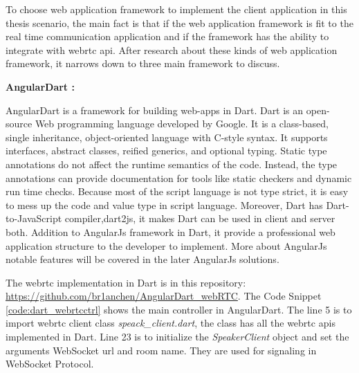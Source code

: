 \noindent To choose web application framework to implement the client application in this thesis scenario, the main fact is that if the web  application framework is fit to the real time communication application and if the framework has the ability to integrate with \gls{webrtc} \gls{api}. After research about these kinds of web application framework, it narrows down to three main framework to discuss.

\textbf{AngularDart :}

\par AngularDart is a framework for building web-apps in Dart. Dart is an open-source Web programming language developed by Google. It is a class-based, single inheritance, object-oriented language with C-style syntax. It supports interfaces, abstract classes, reified generics, and optional typing. Static type annotations do not affect the runtime semantics of the code. Instead, the type annotations can provide documentation for tools like static checkers and dynamic run time checks.\cite{wiki:dart} Because most of the script language is not type strict, it is easy to mess up the code and value type in script language. Moreover, Dart has Dart-to-JavaScript compiler,dart2js, it makes Dart can be used in client and server both. Addition to AngularJs framework in Dart, it provide a professional web application structure to the developer to implement. More about AngularJs notable features will be covered in the later AngularJs solutions. 

\par The \gls{webrtc} implementation in Dart is in this repository: \url{https://github.com/br1anchen/AngularDart_webRTC}. The Code Snippet \ref{code:dart_webrtcctrl} shows the main controller in AngularDart. The line 5 is to import \gls{webrtc} client class \textit{speack\_client.dart}, the class has all the \gls{webrtc} \gls{api}s implemented in Dart. Line 23 is to initialize the \textit{SpeakerClient} object and set the arguments WebSocket url and room name. They are used for signaling in WebSocket Protocol.

